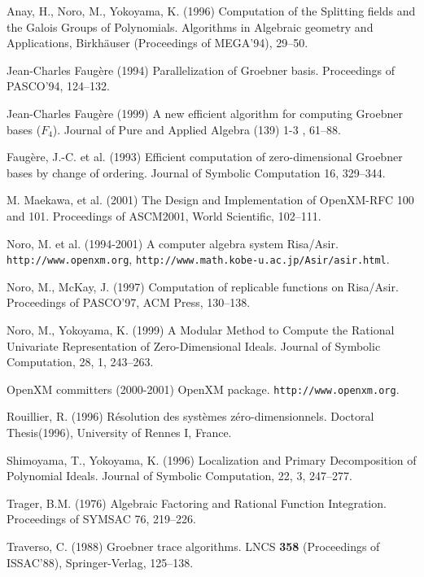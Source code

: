 \documentclass[runningheads]{cl2emult}
\begin{document}
\begin{thebibliography}{7}
%

Anay, H., Noro, M., Yokoyama, K. (1996)
Computation of the Splitting fields and the Galois Groups of Polynomials.
Algorithms in Algebraic geometry and Applications, 
Birkh\"auser (Proceedings of MEGA'94), 29--50.

Jean-Charles Faug\`ere (1994)
Parallelization of Groebner basis.
Proceedings of PASCO'94, 124--132.

Jean-Charles Faug\`ere (1999)
A new efficient algorithm for computing Groebner bases  ($F_4$).
Journal of Pure and Applied Algebra (139) 1-3 , 61--88.

Faug\`ere, J.-C. et al. (1993)
Efficient computation of zero-dimensional Groebner bases by change of ordering.
Journal of Symbolic Computation 16, 329--344.

M. Maekawa, et al. (2001)
The Design and Implementation of OpenXM-RFC 100 and 101.
Proceedings of ASCM2001, World Scientific, 102--111.

Noro, M. et al. (1994-2001)
A computer algebra system Risa/Asir.
{\tt http://www.openxm.org}, {\tt http://www.math.kobe-u.ac.jp/Asir/asir.html}.

Noro, M., McKay, J. (1997)
Computation of replicable functions on Risa/Asir.
Proceedings of PASCO'97, ACM Press, 130--138.

Noro, M., Yokoyama, K. (1999)
A Modular Method to Compute the Rational Univariate
Representation of Zero-Dimensional Ideals.
Journal of Symbolic Computation, 28, 1, 243--263.

OpenXM committers (2000-2001)
OpenXM package.
{\tt http://www.openxm.org}.

Rouillier, R. (1996)
R\'esolution des syst\`emes z\'ero-dimensionnels. 
Doctoral Thesis(1996), University of Rennes I, France.

Shimoyama, T., Yokoyama, K. (1996)
Localization and Primary Decomposition of Polynomial Ideals.
Journal of Symbolic Computation, 22, 3, 247--277.

Trager, B.M. (1976)
Algebraic Factoring and Rational Function Integration.
Proceedings of SYMSAC 76, 219--226.

Traverso, C. (1988)
Groebner trace algorithms.
LNCS {\bf 358} (Proceedings of ISSAC'88), Springer-Verlag, 125--138.


\end{thebibliography}
\end{document}
